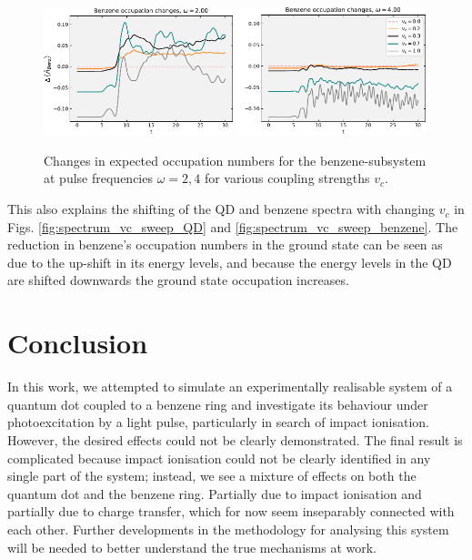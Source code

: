 \begin{figure}[!hbt]
    \centering
    \includegraphics[width=0.49\textwidth]{graph/occupation/occupation_w2_Benz_sum_vcsweep.pdf}
    \includegraphics[width=0.49\textwidth]{graph/occupation/occupation_w4_Benz_sum_vcsweep.pdf}
    \caption{Changes in expected occupation numbers for the benzene-subsystem at pulse frequencies $\omega=2, 4$ for various coupling strengths $v_c$.}
    \label{fig:occupation_qd_benzene_sum_vcsweep} 
\end{figure}

This also explains the shifting of the QD and benzene spectra with changing $v_c$ in Figs. \ref{fig:spectrum_vc_sweep_QD} and \ref{fig:spectrum_vc_sweep_benzene}. The reduction in benzene's occupation numbers in the ground state can be seen as due to the up-shift in its energy levels, and because the energy levels in the QD are shifted downwards the ground state occupation increases.


\section{Conclusion}
In this work, we attempted to simulate an experimentally realisable system of a quantum dot coupled to a benzene ring and investigate its behaviour under photoexcitation by a light pulse, particularly in search of impact ionisation. However, the desired effects could not be clearly demonstrated. The final result is complicated because impact ionisation could not be clearly identified in any single part of the system; instead, we see a mixture of effects on both the quantum dot and the benzene ring. Partially due to impact ionisation and partially due to charge transfer, which for now seem inseparably connected with each other. Further developments in the methodology for analysing this system will be needed to better understand the true mechanisms at work.